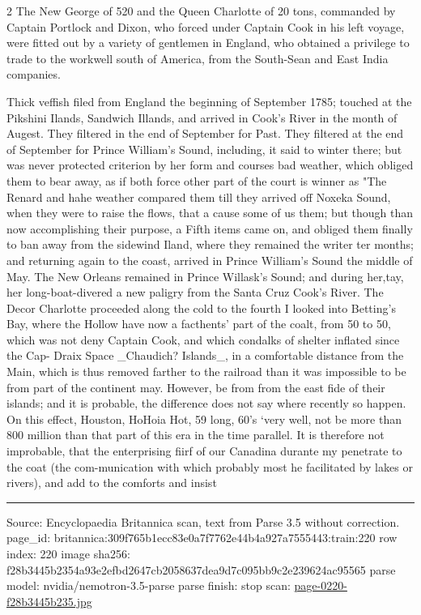 \documentclass[10pt]{article}
\begin{document}
\begin{multicols}{2}
The New George of 520 and the Queen Charlotte of 20 tons, commanded by Captain Portlock and Dixon, who forced under Captain Cook in his left voyage, were fitted out by a variety of gentlemen in England, who obtained a privilege to trade to the workwell south of America, from the South-Sean and East India companies.

Thick veffish filed from England the beginning of September 1785; touched at the Pikshini Ilands, Sandwich Illands, and arrived in Cook's River in the month of Augest. They filtered in the end of September for Past. They filtered at the end of September for Prince William's Sound, including, it said to winter there; but was never protected criterion by her form and courses bad weather, which obliged them to bear away, as if both force other part of the court is winner as "The Renard and hahe weather compared them till they arrived off Noxeka Sound, when they were to raise the flows, that a cause some of us them; but though than now accomplishing their purpose, a Fifth items came on, and obliged them finally to ban away from the sidewind Iland, where they remained the writer ter months; and returning again to the coast, arrived in Prince William's Sound the middle of May. The New Orleans remained in Prince Willask's Sound; and during her,tay, her long-boat-divered a new paligry from the Santa Cruz Cook's River. The Decor Charlotte proceeded along the cold to the fourth I looked into Betting's Bay, where the Hollow have now a facthents' part of the coalt, from 50 to 50, which was not deny Captain Cook, and which condalks of shelter inflated since the Cap- Draix Space \_Chaudich? Islands\_, in a comfortable distance from the Main, which is thus removed farther to the railroad than it was impossible to be from part of the continent may. However, be from from the east fide of their islands; and it is probable, the difference does not say where recently so happen. On this effect, Houston, HoHoia Hot, 59 long, 60’s ‘very well, not be more than 800 million than that part of this era in the time parallel. It is therefore not improbable, that the enterprising fiirf of our Canadina durante my penetrate to the coat (the com-munication with which probably most he facilitated by lakes or rivers), and add to the comforts and insist

\end{multicols}
\vfill\par\noindent\rule{\linewidth}{0.4pt}\par
{\scriptsize\color{gray}\noindent Source: Encyclopaedia Britannica scan, text from Parse 3.5 without correction. page\_id: britannica:309f765b1ecc83e0a7f7762e44b4a927a7555443:train:220 \quad row index: 220 \quad image sha256: f28b3445b2354a93e2efbd2647cb2058637dea9d7c095bb9c2e239624ac95565 \quad parse model: nvidia/nemotron-3.5-parse \quad parse finish: stop \quad scan: \href{../scans/page-0220-f28b3445b235.jpg}{page-0220-f28b3445b235.jpg}\par}
\end{document}
